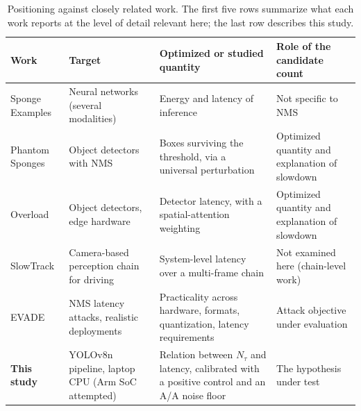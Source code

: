 \documentclass[a4paper,fleqn]{cas-dc}
\newcommand{\Ntau}{N_{\tau}}
\begin{document}
\begin{table}[t]
\centering\small
\caption{Positioning against closely related work. The first five rows summarize what each work reports at the level of detail relevant here; the last row describes this study.}
\label{tab:related}
\begin{tabularx}{\textwidth}{@{}p{2.6cm}p{3.6cm}p{3.6cm}X@{}}
\toprule
Work & Target & Optimized or studied quantity & Role of the candidate count \\
\midrule
Sponge Examples \cite{shumailov2021sponge} & Neural networks (several modalities) & Energy and latency of inference & Not specific to NMS \\
Phantom Sponges \cite{phantom2023} & Object detectors with NMS & Boxes surviving the threshold, via a universal perturbation & Optimized quantity and explanation of slowdown \\
Overload \cite{overload2024} & Object detectors, edge hardware & Detector latency, with a spatial-attention weighting & Optimized quantity and explanation of slowdown \\
SlowTrack \cite{slowtrack2024} & Camera-based perception chain for driving & System-level latency over a multi-frame chain & Not examined here (chain-level work) \\
EVADE \cite{evade2025} & NMS latency attacks, realistic deployments & Practicality across hardware, formats, quantization, latency requirements & Attack objective under evaluation \\
\textbf{This study} & YOLOv8n pipeline, laptop CPU (Arm SoC attempted) & Relation between $\Ntau$ and latency, calibrated with a positive control and an A/A noise floor & The hypothesis under test \\
\bottomrule
\end{tabularx}
\end{table}
\end{document}
